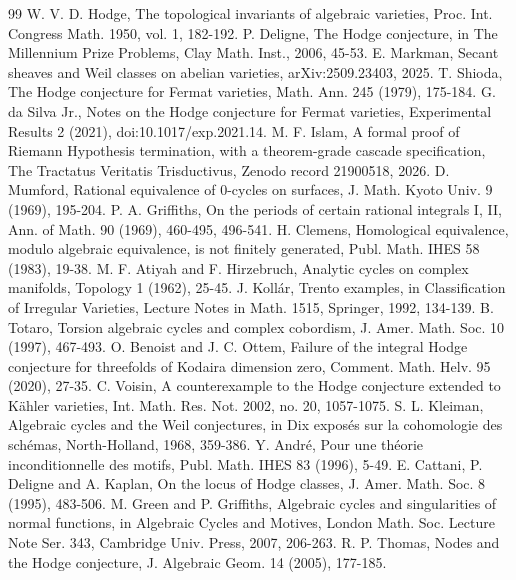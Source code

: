 \documentclass[10pt,twocolumn]{article}
\begin{document}
\begin{thebibliography}{99}
 W. V. D. Hodge, The topological invariants of algebraic varieties, Proc. Int. Congress Math. 1950, vol. 1, 182-192.
 P. Deligne, The Hodge conjecture, in The Millennium Prize Problems, Clay Math. Inst., 2006, 45-53.
 E. Markman, Secant sheaves and Weil classes on abelian varieties, arXiv:2509.23403, 2025.
 T. Shioda, The Hodge conjecture for Fermat varieties, Math. Ann. 245 (1979), 175-184.
 G. da Silva Jr., Notes on the Hodge conjecture for Fermat varieties, Experimental Results 2 (2021), doi:10.1017/exp.2021.14.
 M. F. Islam, A formal proof of Riemann Hypothesis termination, with a theorem-grade cascade specification, The Tractatus Veritatis Trisductivus, Zenodo record 21900518, 2026.
 D. Mumford, Rational equivalence of 0-cycles on surfaces, J. Math. Kyoto Univ. 9 (1969), 195-204.
 P. A. Griffiths, On the periods of certain rational integrals I, II, Ann. of Math. 90 (1969), 460-495, 496-541.
 H. Clemens, Homological equivalence, modulo algebraic equivalence, is not finitely generated, Publ. Math. IHES 58 (1983), 19-38.
 M. F. Atiyah and F. Hirzebruch, Analytic cycles on complex manifolds, Topology 1 (1962), 25-45.
 J. Kollár, Trento examples, in Classification of Irregular Varieties, Lecture Notes in Math. 1515, Springer, 1992, 134-139.
 B. Totaro, Torsion algebraic cycles and complex cobordism, J. Amer. Math. Soc. 10 (1997), 467-493.
 O. Benoist and J. C. Ottem, Failure of the integral Hodge conjecture for threefolds of Kodaira dimension zero, Comment. Math. Helv. 95 (2020), 27-35.
 C. Voisin, A counterexample to the Hodge conjecture extended to Kähler varieties, Int. Math. Res. Not. 2002, no. 20, 1057-1075.
 S. L. Kleiman, Algebraic cycles and the Weil conjectures, in Dix exposés sur la cohomologie des schémas, North-Holland, 1968, 359-386.
 Y. André, Pour une théorie inconditionnelle des motifs, Publ. Math. IHES 83 (1996), 5-49.
 E. Cattani, P. Deligne and A. Kaplan, On the locus of Hodge classes, J. Amer. Math. Soc. 8 (1995), 483-506.
 M. Green and P. Griffiths, Algebraic cycles and singularities of normal functions, in Algebraic Cycles and Motives, London Math. Soc. Lecture Note Ser. 343, Cambridge Univ. Press, 2007, 206-263.
 R. P. Thomas, Nodes and the Hodge conjecture, J. Algebraic Geom. 14 (2005), 177-185.

\end{thebibliography}
\end{document}
